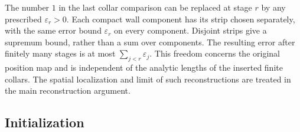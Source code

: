 \begin{remark}\label{packet:small-displacement}
The number $1$ in the last collar comparison can be replaced at stage
$r$ by any prescribed $\varepsilon_r>0$.  Each compact wall component
has its strip chosen separately, with the same error bound
$\varepsilon_r$ on every component.  Disjoint strips give a supremum
bound, rather than a sum over components.  The resulting error after
finitely many stages is at most $\sum_{j<r}\varepsilon_j$.
This freedom concerns the original position map and is independent
of the analytic lengths of the inserted finite collars.  The spatial
localization and limit of such reconstructions are treated in the
main reconstruction argument.
\end{remark}

\subsection{Initialization}

